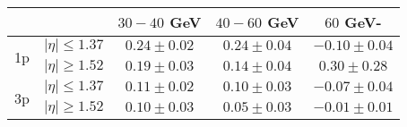 \centering
\begin{tabular}{|c|c|c|c|c|} \hline
                  &  & $30-40$ GeV & $40-60$ GeV & $60$ GeV-  \\ \hline
\multirow{2}{*}{1p} &$\lvert \eta \rvert \leq 1.37$ & $0.24\pm0.02$ & $0.24\pm0.04$ & $-0.10\pm0.04$\\\cline{2-5}
                    &$\lvert \eta \rvert \geq 1.52$ & $0.19\pm0.03$ & $0.14\pm0.04$ & $0.30\pm0.28$ \\\hline 
\multirow{2}{*}{3p} &$\lvert \eta \rvert \leq 1.37$ & $0.11\pm0.02$ & $0.10\pm0.03$ & $-0.07\pm0.04$\\\cline{2-5}
                    &$\lvert \eta \rvert \geq 1.52$ & $0.10\pm0.03$ & $0.05\pm0.03$ & $-0.01\pm0.01$\\\hline  
\end{tabular}